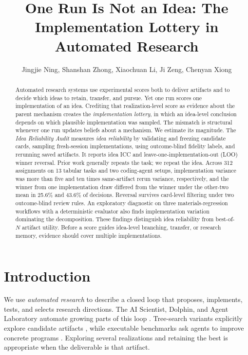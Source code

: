 \documentclass[letterpaper]{article}
\title{One Run Is Not an Idea: The Implementation Lottery in Automated Research}
\author{Jingjie Ning, Shanshan Zhong, Xiaochuan Li, Ji Zeng, Chenyan Xiong}
\begin{document}
\maketitle

\begin{abstract}
Automated research systems use experimental scores both to deliver artifacts and to decide which ideas to retain, transfer, and pursue. Yet one run scores one implementation of an idea. Crediting that realization-level score as evidence about the parent mechanism creates the \emph{implementation lottery}, in which an idea-level conclusion depends on which plausible implementation was sampled. The mismatch is structural whenever one run updates beliefs about a mechanism. We estimate its magnitude. The \emph{Idea Reliability Audit} measures \emph{idea reliability} by validating and freezing candidate cards, sampling fresh-session implementations, using outcome-blind fidelity labels, and rerunning saved artifacts. It reports idea ICC and leave-one-implementation-out (LOO) winner reversal. Prior work generally repeats the task; we repeat the idea. Across 312 assignments on 13 tabular tasks and two coding-agent setups, implementation variance was more than five and ten times same-artifact rerun variance, respectively, and the winner from one implementation draw differed from the winner under the other-two mean in 25.6\% and 43.6\% of decisions. Reversal survives card-level filtering under two outcome-blind review rules. An exploratory diagnostic on three materials-regression workflows with a deterministic evaluator also finds implementation variation dominating the decomposition. These findings distinguish idea reliability from best-of-$N$ artifact utility. Before a score guides idea-level branching, transfer, or research memory, evidence should cover multiple implementations.
\end{abstract}

\section{Introduction}

We use \emph{automated research} to describe a closed loop that proposes, implements, tests, and selects research directions. The AI Scientist, Dolphin, and Agent Laboratory automate growing parts of this loop \cite{lu2024aiscientist,yuan2025dolphin,schmidgall2025agentlab}. Tree-search variants explicitly explore candidate artifacts \cite{yamada2025aiscientistv2}, while executable benchmarks ask agents to improve concrete programs \cite{nathani2025mlgym,garikaparthi2026researchgym}. Exploring several realizations and retaining the best is appropriate when the deliverable is that artifact.
\end{document}
